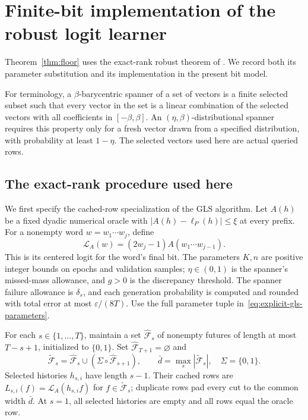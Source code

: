 \documentclass[11pt]{article}
\theoremstyle{definition}
\theoremstyle{remark}
\begin{document}
\section{Finite-bit implementation of the robust logit learner}\label{sec:finite-bit-gls}

Theorem~\ref{thm:floor} uses the exact-rank robust theorem of \citet[Theorem~5.11]{gls2}. We record both its parameter substitution and its implementation in the present bit model.

For terminology, a $\beta$-barycentric spanner of a set of vectors is a finite selected subset such that every vector in the set is a linear combination of the selected vectors with all coefficients in $[-\beta,\beta]$. An $(\eta,\beta)$-distributional spanner requires this property only for a fresh vector drawn from a specified distribution, with probability at least $1-\eta$. The selected vectors used here are actual queried rows.

\subsection{The exact-rank procedure used here}\label{sec:explicit-gls-procedure}

We first specify the cached-row specialization of the GLS algorithm. Let $A(h)$ be a fixed dyadic numerical oracle with $|A(h)-\ell_P(h)|\le\xi$ at every prefix. For a nonempty word $w=w_1\cdots w_j$, define
\[
\mathcal L_A(w)=(2w_j-1)A(w_1\cdots w_{j-1}).
\]
This is its centered logit for the word's final bit. The parameters $K,n$ are positive integer bounds on epochs and validation samples; $\eta\in(0,1)$ is the spanner's missed-mass allowance, and $g>0$ is the discrepancy threshold. The spanner failure allowance is $\delta_s$, and each generation probability is computed and rounded with total error at most $\varepsilon/(8T)$. Use the full parameter tuple in~\eqref{eq:explicit-gls-parameters}.

For each $s\in\{1,\ldots,T\}$, maintain a set $\hat{\mathcal F}_s$ of nonempty futures of length at most $T-s+1$, initialized to $\{0,1\}$. Set $\hat{\mathcal F}_{T+1}=\varnothing$ and
\[
\tilde{\mathcal F}_s=\hat{\mathcal F}_s\cup
  (\Sigma\circ\hat{\mathcal F}_{s+1}),\qquad
\bar d=\max_s|\tilde{\mathcal F}_s|,
\quad\Sigma=\{0,1\}.
\]
Selected histories $h_{s,i}$ have length $s-1$. Their cached rows are
$L_{s,i}(f)=\mathcal L_A(h_{s,i}f)$ for $f\in\tilde{\mathcal F}_s$; duplicate rows pad every cut to the common width $\bar d$. At $s=1$, all selected histories are empty and all rows equal the oracle row.
\end{document}
